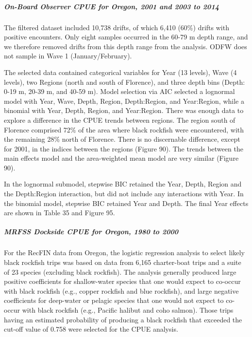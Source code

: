 \documentclass[11pt,
  english,
  letterpaper,
]{article}
\begin{document}
\hypertarget{on-board-observer-cpue-for-oregon-2001-and-2003-to-2014}{%
\subparagraph{On-Board Observer CPUE for Oregon, 2001 and 2003 to 2014}\label{on-board-observer-cpue-for-oregon-2001-and-2003-to-2014}}

The filtered dataset included 10,738 drifts, of which 6,410 (60\%) drifts with positive encounters. Only eight samples occurred in the 60-79 m depth range, and we therefore removed drifts from this depth range from the analysis. ODFW does not sample in Wave 1 (January/February).

The selected data contained categorical variables for Year (13 levels), Wave (4 levels), two Regions (north and south of Florence), and three depth bins (Depth: 0-19 m, 20-39 m, and 40-59 m). Model selection via AIC selected a lognormal model with Year, Wave, Depth, Region, Depth:Region, and Year:Region, while a binomial with Year, Depth, Region, and Year:Region. There was enough data to explore a difference in the CPUE trends between regions. The region south of Florence comprised 72\% of the area where black rockfish were encountered, with the remaining 28\% north of Florence. There is no discernable difference, except for 2001, in the indices between the regions (Figure 90). The trends between the main effects model and the area-weighted mean model are very similar (Figure 90).

In the lognormal submodel, stepwise BIC retained the Year, Depth, Region and the Depth:Region interaction, but did not include any interactions with Year. In the binomial model, stepwise BIC retained Year and Depth. The final Year effects are shown in Table 35 and Figure 95.

\hypertarget{mrfss-dockside-cpue-for-oregon-1980-to-2000}{%
\subparagraph{MRFSS Dockside CPUE for Oregon, 1980 to 2000}\label{mrfss-dockside-cpue-for-oregon-1980-to-2000}}

For the RecFIN data from Oregon, the logistic regression analysis to select likely black rockfish trips was based on data from 6,165 charter-boat trips and a suite of 23 species (excluding black rockfish). The analysis generally produced large positive coefficients for shallow-water species that one would expect to co-occur with black rockfish (e.g., copper rockfish and blue rockfish), and large negative coefficients for deep-water or pelagic species that one would not expect to co-occur with black rockfish (e.g., Pacific halibut and coho salmon). Those trips having an estimated probability of producing a black rockfish that exceeded the cut-off value of 0.758 were selected for the CPUE analysis.
\end{document}
